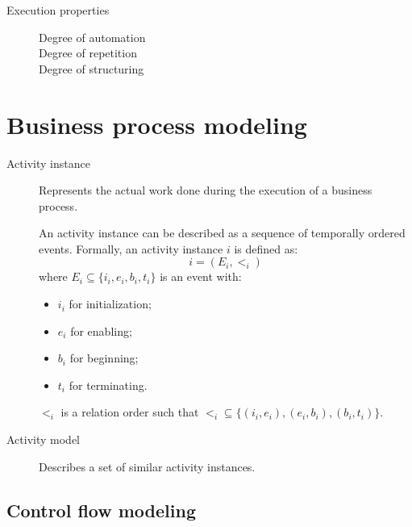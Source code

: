 \begin{description}
\begin{description}
            \item[Execution properties] \phantom{}
                \begin{description}
                    \item[Degree of automation] 
                    \item[Degree of repetition] 
                    \item[Degree of structuring] 
                \end{description}
        \end{description}
\end{description}



\section{Business process modeling}

\begin{description}
    \item[Activity instance] 
        Represents the actual work done during the execution of a business process.

        An activity instance can be described as a sequence of temporally ordered events.
        Formally, an activity instance $i$ is defined as:
        \[ i = (E_i, <_i) \]
        where $E_i \subseteq \{ i_i, e_i, b_i, t_i \}$ is an event with:
        \begin{itemize}
            \item $i_i$ for initialization;
            \item $e_i$ for enabling;
            \item $b_i$ for beginning;
            \item $t_i$ for terminating.
        \end{itemize}
        $<_i$ is a relation order such that $<_i \subseteq \{ (i_i, e_i), (e_i, b_i), (b_i, t_i) \}$.

    \item[Activity model] 
        Describes a set of similar activity instances.
\end{description}


\subsection{Control flow modeling}


